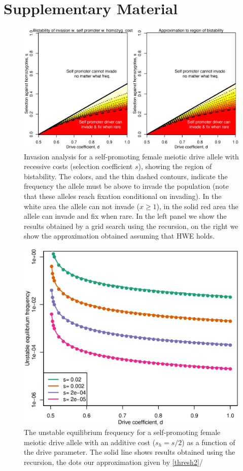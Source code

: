 \documentclass[12pt,letterpaper]{article}
\begin{document}
\section*{Supplementary Material}


\begin{figure}

\includegraphics[width = 0.5
          \textwidth]{../Scripts/homozyg_bistability.eps}
\caption{Invasion analysis for a self-promoting female meiotic drive allele with
  recessive costs (selection coefficient $s$), showing the region of
  bistability. The colors, and the thin dashed contours, indicate the
  frequency the allele must be above to invade the population (note
  that these alleles reach fixation conditional on invading). In the
  white area the allele can not invade ($x \geq1$), in the solid red
  area the allele can invade and fix when rare. In the left panel we
  show the results obtained by a grid search using the recursion, on
  the right we show the approximation obtained assuming that HWE
  holds. }  
\label{Bistab_homozyg_cost_fig}
\end{figure}

\begin{figure}
\includegraphics[width = 0.8 \textwidth]{Figures/bistable_x_vs_d_additive_s.eps} 
\caption{The unstable equilibrium frequency for a self-promoting
  female meiotic drive allele with an additive cost ($s_h=s/2$) as a
  function of the drive parameter. The solid line shows results
  obtained using the recursion, the dots our approximation given by \eqref{thresh2}/}  \label{bistable_additive}
\end{figure}
\end{document}
